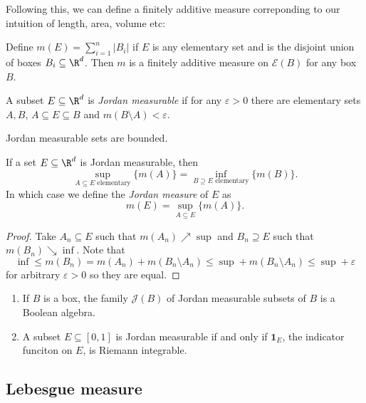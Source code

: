 \documentclass[a4paper]{article}
\begin{document}
Following this, we can define a finitely additive measure correponding to our intuition of length, area, volume etc:

\begin{proposition}
  Define \(m(E) = \sum_{i = 1}^n |B_i|\) if \(E\) is any elementary set and is the disjoint union of boxes \(B_i \subseteq \R^d\). Then \(m\) is a finitely additive measure on \(\mathcal E(B)\) for any box \(B\).
\end{proposition}

\begin{definition}
  A subset \(E \subseteq \R^d\) is \emph{Jordan measurable} if for any \(\varepsilon > 0\) there are elementary sets \(A, B\), \(A \subseteq E \subseteq B\) and \(m(B \setminus A) < \varepsilon\).
\end{definition}

\begin{remark}
  Jordan measurable sets are bounded.
\end{remark}

\begin{proposition}
  If a set \(E \subseteq \R^d\) is Jordan measurable, then
  \[
    \sup_{A \subseteq E \text{ elementary}} \{m(A)\} = \inf_{B \supseteq E \text{ elementary}} \{m(B)\}.
  \]
  In which case we define the \emph{Jordan measure} of \(E\) as
  \[
    m(E) = \sup_{A \subseteq E} \{m(A)\}.
  \]
\end{proposition}

\begin{proof}
  Take \(A_n \subseteq E\) such that \(m(A_n) \nearrow \sup\) and \(B_n \supseteq E\) such that \(m(B_n) \searrow \inf\). Note that
  \[
    \inf \leq m(B_n) = m(A_n) + m(B_n \setminus A_n) \leq \sup + m(B_n \setminus A_n) \leq \sup + \varepsilon
  \]
  for arbitrary \(\varepsilon > 0\) so they are equal.
\end{proof}

\begin{ex}\leavevmode
  \begin{enumerate}
  \item If \(B\) is a box, the family \(\mathcal J(B)\) of Jordan measurable subsets of \(B\) is a Boolean algebra.
  \item A subset \(E \subseteq [0, 1]\) is Jordan measurable if and only if \(\mathbf 1_E\), the indicator funciton on \(E\), is Riemann integrable.
  \end{enumerate}
\end{ex}

\subsection{Lebesgue measure}
\end{document}
